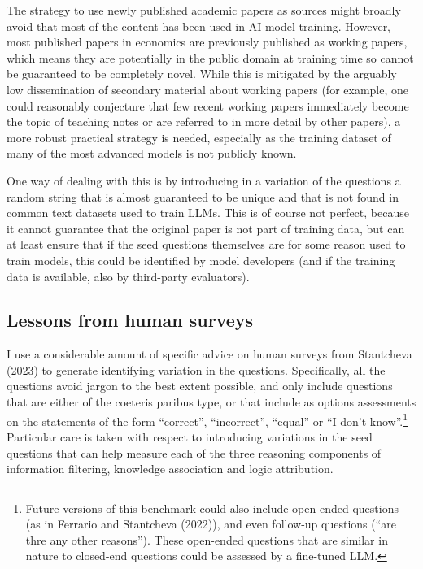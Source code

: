 \documentclass[
]{article}
\begin{document}
The strategy to use newly published academic papers as sources might
broadly avoid that most of the content has been used in AI model
training. However, most published papers in economics are previously
published as working papers, which means they are potentially in the
public domain at training time so cannot be guaranteed to be completely
novel. While this is mitigated by the arguably low dissemination of
secondary material about working papers (for example, one could
reasonably conjecture that few recent working papers immediately become
the topic of teaching notes or are referred to in more detail by other
papers), a more robust practical strategy is needed, especially as the
training dataset of many of the most advanced models is not publicly
known.

One way of dealing with this is by introducing in a variation of the
questions a random string that is almost guaranteed to be unique and
that is not found in common text datasets used to train LLMs. This is of
course not perfect, because it cannot guarantee that the original paper
is not part of training data, but can at least ensure that if the seed
questions themselves are for some reason used to train models, this
could be identified by model developers (and if the training data is
available, also by third-party evaluators).

\subsection{Lessons from human
surveys}\label{lessons-from-human-surveys}

I use a considerable amount of specific advice on human surveys from
Stantcheva (2023) to generate identifying variation in the questions.
Specifically, all the questions avoid jargon to the best extent
possible, and only include questions that are either of the coeteris
paribus type, or that include as options assessments on the statements
of the form ``correct'', ``incorrect'', ``equal'' or ``I don't
know''.\footnote{Future versions of this benchmark could also include
  open ended questions (as in Ferrario and Stantcheva (2022)), and even
  follow-up questions (``are thre any other reasons''). These open-ended
  questions that are similar in nature to closed-end questions could be
  assessed by a fine-tuned LLM.} Particular care is taken with respect
to introducing variations in the seed questions that can help measure
each of the three reasoning components of information filtering,
knowledge association and logic attribution.
\end{document}
